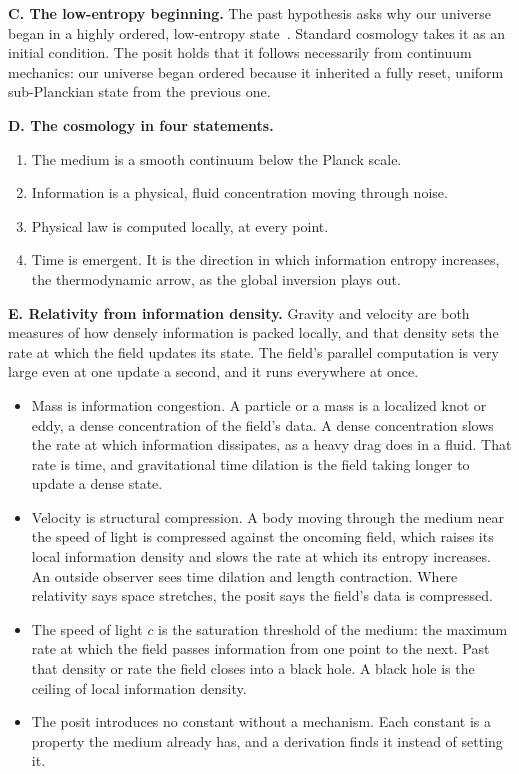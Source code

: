 \textbf{C. The low-entropy beginning.} The past hypothesis asks why our universe began in a highly
ordered, low-entropy state~\cite{src:Albert-2000}. Standard cosmology takes it as an initial
condition. The posit holds that it follows necessarily from continuum mechanics: our universe began
ordered because it inherited a fully reset, uniform sub-Planckian state from the previous one.

\textbf{D. The cosmology in four statements.}
\begin{enumerate}
\item The medium is a smooth continuum below the Planck scale.
\item Information is a physical, fluid concentration moving through noise.
\item Physical law is computed locally, at every point.
\item Time is emergent. It is the direction in which information entropy increases, the
thermodynamic arrow, as the global inversion plays out.
\end{enumerate}

\textbf{E. Relativity from information density.} Gravity and velocity are both measures of how densely
information is packed locally, and that density sets the rate at which the field updates its state.
The field's parallel computation is very large even at one update a second, and it runs everywhere at
once.

\begin{itemize}
\item Mass is information congestion. A particle or a mass is a localized knot or eddy, a dense
concentration of the field's data. A dense concentration slows the rate at which information
dissipates, as a heavy drag does in a fluid. That rate is time, and gravitational time dilation is the
field taking longer to update a dense state.

\item Velocity is structural compression. A body moving through the medium near the speed of light is
compressed against the oncoming field, which raises its local information density and slows the rate
at which its entropy increases. An outside observer sees time dilation and length contraction. Where
relativity says space stretches, the posit says the field's data is compressed.

\item The speed of light $c$ is the saturation threshold of the medium: the maximum rate at which the
field passes information from one point to the next. Past that density or rate the field closes into a
black hole. A black hole is the ceiling of local information density.

\item The posit introduces no constant without a mechanism. Each constant is a property the medium
already has, and a derivation finds it instead of setting it.
\end{itemize}


